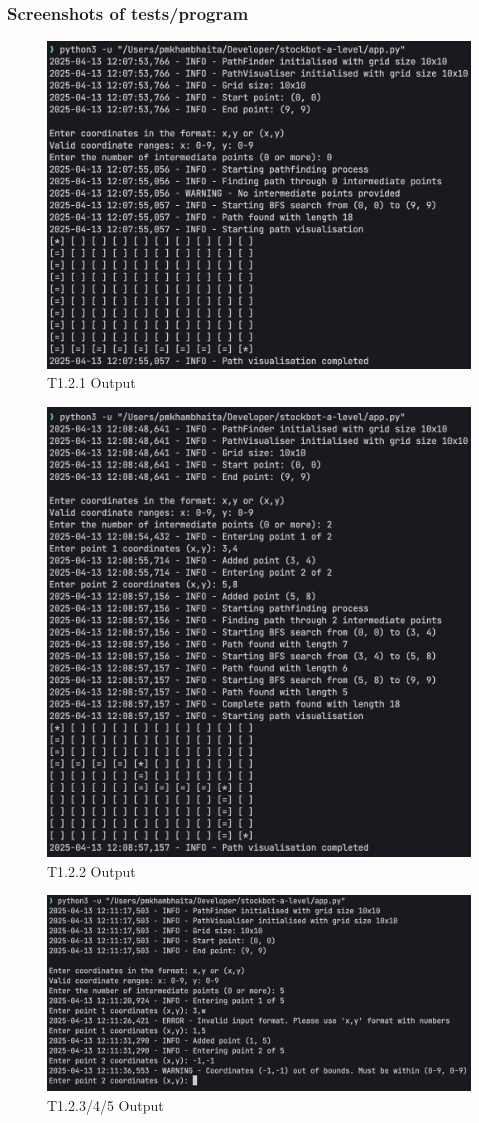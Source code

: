 \newpage

\subsubsection{Screenshots of tests/program}

\begin{figure}[htbp!]
    \centering
    \includegraphics[width=0.5\linewidth]{Images/t1.2.1.png}
    \caption{T1.2.1 Output}
    \label{fig:enter-label}
\end{figure}

\begin{figure}[htbp!]
    \centering
    \includegraphics[width=0.5\linewidth]{Images/t1.2.2.png}
    \caption{T1.2.2 Output}
    \label{fig:enter-label}
\end{figure}

\begin{figure}[htbp!]
    \centering
    \includegraphics[width=0.5\linewidth]{Images/t1.2.x.png}
    \caption{T1.2.3/4/5 Output}
    \label{fig:enter-label}
\end{figure}

